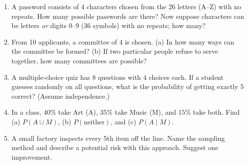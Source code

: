 \documentclass[11pt]{article}
\begin{document}
\begin{enumerate}

\item A password consists of 4 characters chosen from the 26 letters (A--Z) with no repeats. How many possible passwords are there? Now suppose characters can be letters \emph{or} digits 0--9 (36 symbols) with no repeats; how many?

\item From 10 applicants, a committee of 4 is chosen. (a) In how many ways can the committee be formed? (b) If two particular people refuse to serve together, how many committees are possible?

\item A multiple-choice quiz has 8 questions with 4 choices each. If a student guesses randomly on all questions, what is the probability of getting exactly 5 correct? (Assume independence.)

\item In a class, $40\%$ take Art (A), $35\%$ take Music (M), and $15\%$ take both. Find (a) $P(A\cup M)$, (b) $P(\text{neither})$, and (c) $P(A\mid M)$.

\item A small factory inspects every 5th item off the line. Name the sampling method and describe a potential risk with this approach. Suggest one improvement.
\end{enumerate}

\newpage
\end{document}

